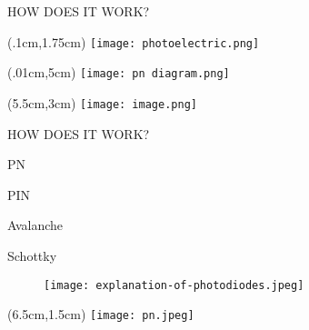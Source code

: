 \documentclass[14pt]{beamer}
\begin{document}
\begin{frame}{HOW DOES IT WORK?}
	
		\begin{textblock*}{4cm}(.1cm,1.75cm) %
		\texttt{[image: photoelectric.png]}
	\end{textblock*}

		\begin{textblock*}{4cm}(.01cm,5cm) %
	\texttt{[image: pn diagram.png]}
\end{textblock*}
	
			\begin{textblock*}{4cm}(5.5cm,3cm) %
		\texttt{[image: image.png]}
	\end{textblock*}
\end{frame}

\begin{frame}{HOW DOES IT WORK?}
	
			\begin{flushleft}
		\begin{list}{--}{}
			\item PN 
			\item PIN
			\item Avalanche
			\item Schottky 
		\end{list}
	\end{flushleft}	
	\vspace{5mm}
	
	\begin{figure}[H]
		\begin{flushleft}
			\texttt{[image: explanation-of-photodiodes.jpeg]}
		\end{flushleft}
	\end{figure}
	
	\begin{textblock*}{4cm}(6.5cm,1.5cm) %
		\texttt{[image: pn.jpeg]}
	\end{textblock*}
	
\end{frame}
\end{document}
